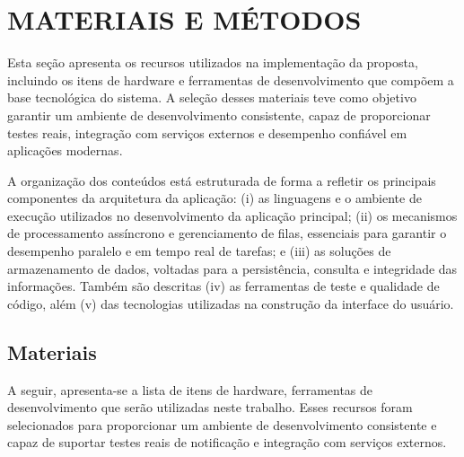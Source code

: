 




\section{MATERIAIS E MÉTODOS} %
\label{sec:metodologia}

Esta seção apresenta os recursos utilizados na implementação da proposta, incluindo os itens de hardware e ferramentas de desenvolvimento que compõem a base tecnológica do sistema. A seleção desses materiais teve como objetivo garantir um ambiente de desenvolvimento consistente, capaz de proporcionar testes reais, integração com serviços externos e desempenho confiável em aplicações modernas. 

A organização dos conteúdos está estruturada de forma a refletir os principais componentes da arquitetura da aplicação: (i) as linguagens e o ambiente de execução utilizados no desenvolvimento da aplicação principal; (ii) os mecanismos de processamento assíncrono e gerenciamento de filas, essenciais para garantir o desempenho paralelo e em tempo real de tarefas; e (iii) as soluções de armazenamento de dados, voltadas para a persistência, consulta e integridade das informações. Também são descritas (iv) as ferramentas de teste e qualidade de código, além (v) das tecnologias utilizadas na construção da interface do usuário.

\subsection{Materiais}
    A seguir, apresenta-se a lista de itens de hardware, ferramentas de desenvolvimento que serão utilizadas neste trabalho. Esses recursos foram selecionados para proporcionar um ambiente de desenvolvimento consistente e capaz de suportar testes reais de notificação e integração com serviços externos.
    \par\vspace{0.5\baselineskip}
    
